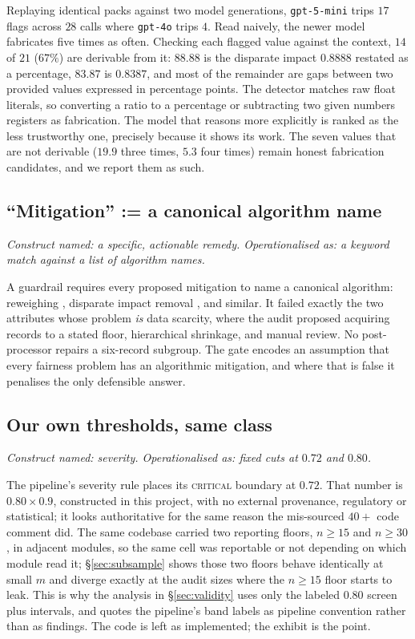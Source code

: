 \documentclass[sigconf,nonacm]{acmart}
\begin{document}
Replaying identical packs against two model generations,
\texttt{gpt-5-mini} trips $17$ flags across $28$ calls where \texttt{gpt-4o}
trips $4$. Read naively, the newer model fabricates five times as often.
Checking each flagged value against the context, $14$ of $21$ ($67\%$) are
derivable from it: $88.88$ is the disparate impact $0.8888$ restated as a
percentage, $83.87$ is $0.8387$, and most of the remainder are gaps between
two provided values expressed in percentage points. The detector matches raw
float literals, so converting a ratio to a percentage or subtracting two given
numbers registers as fabrication. The model that reasons more explicitly is
ranked as the less trustworthy one, precisely because it shows its work. The
seven values that are not derivable ($19.9$ three times, $5.3$ four times)
remain honest fabrication candidates, and we report them as such.

\subsection{``Mitigation'' := a canonical algorithm name}
\label{sec:mitigation}

\emph{Construct named: a specific, actionable remedy. Operationalised as: a
keyword match against a list of algorithm names.}

A guardrail requires every proposed mitigation to name a canonical algorithm:
reweighing \citep{kamiran2011}, disparate impact removal
\citep{feldman2015}, and similar. It failed exactly the two attributes whose
problem \emph{is} data scarcity, where the audit proposed acquiring records to
a stated floor, hierarchical shrinkage, and manual review. No post-processor
repairs a six-record subgroup. The gate encodes an assumption that every
fairness problem has an algorithmic mitigation, and where that is false it
penalises the only defensible answer.

\subsection{Our own thresholds, same class}
\label{sec:ownthresholds}

\emph{Construct named: severity. Operationalised as: fixed cuts at $0.72$ and
$0.80$.}

The pipeline's severity rule places its \textsc{critical} boundary at $0.72$.
That number is $0.80 \times 0.9$, constructed in this project, with no
external provenance, regulatory or statistical; it looks authoritative for
the same reason the mis-sourced $40{+}$ code comment did. The same codebase
carried two reporting floors, $n \geq 15$ and $n \geq 30$, in adjacent
modules, so the same cell was reportable or not depending on which module
read it; \S\ref{sec:subsample} shows those two floors behave identically at
small $m$
and diverge exactly at the audit sizes where the $n \geq 15$ floor starts to
leak. This is why the analysis in \S\ref{sec:validity} uses only the labeled
$0.80$ screen plus intervals, and quotes the pipeline's band labels as
pipeline convention rather than as findings. The code is left as implemented;
the exhibit is the point.
\end{document}
